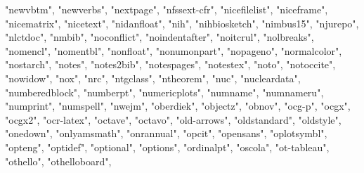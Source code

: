 \documentclass[
]{article}
\newenvironment{Shaded}{\begin{snugshade}}{\end{snugshade}}
\newcommand{\NormalTok}[1]{#1}
\newcommand{\StringTok}[1]{\textcolor[rgb]{0.31,0.60,0.02}{#1}}
\begin{document}
\begin{Shaded}
\begin{Highlighting}[]
\StringTok{"newvbtm"}\NormalTok{, }\StringTok{"newverbs"}\NormalTok{, }\StringTok{"nextpage"}\NormalTok{, }\StringTok{"nfssext{-}cfr"}\NormalTok{, }\StringTok{"nicefilelist"}\NormalTok{, }
\StringTok{"niceframe"}\NormalTok{, }\StringTok{"nicematrix"}\NormalTok{, }\StringTok{"nicetext"}\NormalTok{, }\StringTok{"nidanfloat"}\NormalTok{, }\StringTok{"nih"}\NormalTok{, }\StringTok{"nihbiosketch"}\NormalTok{, }
\StringTok{"nimbus15"}\NormalTok{, }\StringTok{"njurepo"}\NormalTok{, }\StringTok{"nlctdoc"}\NormalTok{, }\StringTok{"nmbib"}\NormalTok{, }\StringTok{"noconflict"}\NormalTok{, }\StringTok{"noindentafter"}\NormalTok{, }
\StringTok{"noitcrul"}\NormalTok{, }\StringTok{"nolbreaks"}\NormalTok{, }\StringTok{"nomencl"}\NormalTok{, }\StringTok{"nomentbl"}\NormalTok{, }\StringTok{"nonfloat"}\NormalTok{, }\StringTok{"nonumonpart"}\NormalTok{, }
\StringTok{"nopageno"}\NormalTok{, }\StringTok{"normalcolor"}\NormalTok{, }\StringTok{"nostarch"}\NormalTok{, }\StringTok{"notes"}\NormalTok{, }\StringTok{"notes2bib"}\NormalTok{, }
\StringTok{"notespages"}\NormalTok{, }\StringTok{"notestex"}\NormalTok{, }\StringTok{"noto"}\NormalTok{, }\StringTok{"notoccite"}\NormalTok{, }\StringTok{"nowidow"}\NormalTok{, }\StringTok{"nox"}\NormalTok{, }
\StringTok{"nrc"}\NormalTok{, }\StringTok{"ntgclass"}\NormalTok{, }\StringTok{"ntheorem"}\NormalTok{, }\StringTok{"nuc"}\NormalTok{, }\StringTok{"nucleardata"}\NormalTok{, }\StringTok{"numberedblock"}\NormalTok{, }
\StringTok{"numberpt"}\NormalTok{, }\StringTok{"numericplots"}\NormalTok{, }\StringTok{"numname"}\NormalTok{, }\StringTok{"numnameru"}\NormalTok{, }\StringTok{"numprint"}\NormalTok{, }
\StringTok{"numspell"}\NormalTok{, }\StringTok{"nwejm"}\NormalTok{, }\StringTok{"oberdiek"}\NormalTok{, }\StringTok{"objectz"}\NormalTok{, }\StringTok{"obnov"}\NormalTok{, }\StringTok{"ocg{-}p"}\NormalTok{, }
\StringTok{"ocgx"}\NormalTok{, }\StringTok{"ocgx2"}\NormalTok{, }\StringTok{"ocr{-}latex"}\NormalTok{, }\StringTok{"octave"}\NormalTok{, }\StringTok{"octavo"}\NormalTok{, }\StringTok{"old{-}arrows"}\NormalTok{, }
\StringTok{"oldstandard"}\NormalTok{, }\StringTok{"oldstyle"}\NormalTok{, }\StringTok{"onedown"}\NormalTok{, }\StringTok{"onlyamsmath"}\NormalTok{, }\StringTok{"onrannual"}\NormalTok{, }
\StringTok{"opcit"}\NormalTok{, }\StringTok{"opensans"}\NormalTok{, }\StringTok{"oplotsymbl"}\NormalTok{, }\StringTok{"opteng"}\NormalTok{, }\StringTok{"optidef"}\NormalTok{, }\StringTok{"optional"}\NormalTok{, }
\StringTok{"options"}\NormalTok{, }\StringTok{"ordinalpt"}\NormalTok{, }\StringTok{"oscola"}\NormalTok{, }\StringTok{"ot{-}tableau"}\NormalTok{, }\StringTok{"othello"}\NormalTok{, }\StringTok{"othelloboard"}\NormalTok{, }

\end{Highlighting}
\end{Shaded}
\end{document}
